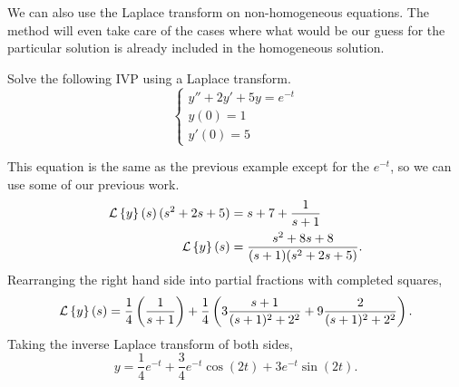 \noindent
We can also use the Laplace transform on non-homogeneous equations.
The method will even take care of the cases where what would be our guess for the particular solution is already included in the homogeneous solution.
\begin{example}
	Solve the following IVP using a Laplace transform.
	\begin{equation*}
		\begin{cases}
			y'' + 2y' + 5y = e^{-t} \\
			y(0) = 1 \\
			y'(0) = 5
		\end{cases}
	\end{equation*}
\end{example}
\noindent
This equation is the same as the previous example except for the $e^{-t}$, so we can use some of our previous work.
\begin{align*}
	\mathcal{L}\left\{ y \right\}\left(s\right)(s^2 + 2s + 5) &= s + 7 + \frac{1}{s+1} \\
	\mathcal{L}\left\{ y \right\}\left(s\right) &= \frac{s^2 + 8s + 8}{(s+1)(s^2 + 2s + 5)}.
\end{align*}
Rearranging the right hand side into partial fractions with completed squares,
\begin{equation*}
	\mathcal{L}\left\{ y \right\}\left(s\right) = \frac{1}{4}\left(\frac{1}{s+1}\right) + \frac{1}{4}\left(3\frac{s+1}{(s+1)^2 + 2^2} + 9\frac{2}{(s+1)^2 + 2^2}\right).
\end{equation*}
Taking the inverse Laplace transform of both sides,
\begin{equation*}
	y = \frac{1}{4}e^{-t} + \frac{3}{4}e^{-t}\cos{(2t)} + 3e^{-t}\sin{(2t)}.
\end{equation*}

